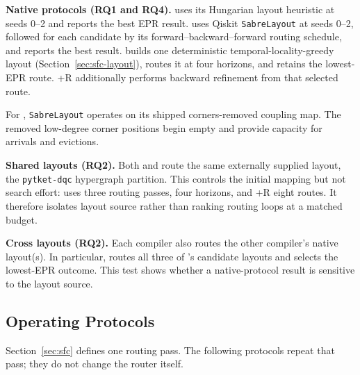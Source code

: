 \textbf{Native protocols (RQ1 and RQ4).} \TeleSABRE{} uses its Hungarian
layout heuristic at seeds 0--2 and reports the best EPR result. \dSABRE{}
uses Qiskit \texttt{SabreLayout} at seeds 0--2, followed for each candidate
by its forward--backward--forward routing schedule, and reports the best
result. \PORTER{} builds one deterministic temporal-locality-greedy layout
(Section~\ref{sec:sfc-layout}), routes it at four horizons, and retains the
lowest-EPR route. \PORTER{}+R additionally performs backward refinement
from that selected route.

For \dSABRE{}, \texttt{SabreLayout} operates on its shipped
corners-removed coupling map. The removed low-degree corner positions begin
empty and provide capacity for arrivals and evictions.

\textbf{Shared layouts (RQ2).} Both \dSABRE{} and \PORTER{} route the same
externally supplied layout, the \texttt{pytket-dqc} hypergraph partition. This controls the initial mapping but not search effort:
\dSABRE{} uses three routing passes, \PORTER{} four horizons, and
\PORTER{}+R eight routes. It therefore isolates layout source rather than
ranking routing loops at a matched budget.

\textbf{Cross layouts (RQ2).} Each compiler also routes the other
compiler's native layout(s). In particular, \PORTER{} routes all three of
\dSABRE{}'s candidate layouts and selects the lowest-EPR outcome. This test
shows whether a native-protocol result is sensitive to the layout source.

\subsection{Operating Protocols}
\label{sec:opprotocols}

Section~\ref{sec:sfc} defines one routing pass. The following protocols
repeat that pass; they do not change the router itself.

